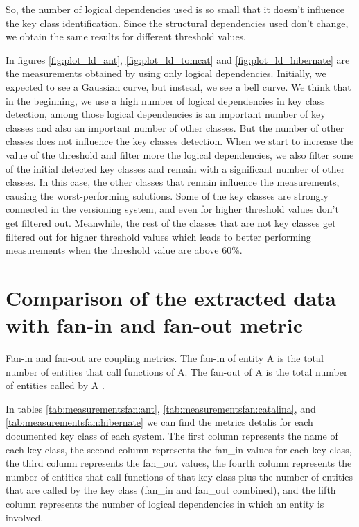 \documentclass[12pt, a4paper, twoside]{report}
\begin{document}
 So, the number of logical dependencies used is so small that it doesn't influence the key class identification. Since the structural dependencies used don't change, we obtain the same results for different threshold values. 



In figures \ref{fig:plot_ld_ant}, \ref{fig:plot_ld_tomcat} and \ref{fig:plot_ld_hibernate} are the measurements obtained by using only logical dependencies.
Initially, we expected to see a Gaussian curve, but instead, we see a bell curve.  We think that in the beginning, we use a high number of logical dependencies in key class detection, among those logical dependencies is an important number of key classes and also an important number of other classes. But the number of other classes does not influence the key classes detection. When we start to increase the value of the threshold and filter more the logical dependencies, we also filter some of the initial detected key classes and remain with a significant number of other classes. In this case, the other classes that remain influence the measurements, causing the worst-performing solutions. 
Some of the key classes are strongly connected in the versioning system, and even for higher threshold values don't get filtered out. Meanwhile, the rest of the classes that are not key classes get filtered out for higher threshold values which leads to better performing measurements when the threshold value are above 60\%. 



\section{Comparison of the extracted data with fan-in and fan-out metric}
\label{sec:metrics}

Fan-in and fan-out are coupling metrics. The fan-in of entity A is the total number of entities that call functions of A. The fan-out of A is the total number of entities called by A \cite{5507329}.


In tables \ref{tab:measurementsfan:ant}, \ref{tab:measurementsfan:catalina}, and \ref{tab:measurementsfan:hibernate} we can find the metrics detalis for each documented key class of each system.
The first column represents the name of each key class, the second column represents the fan\_in values for each key class, the third column represents the fan\_out values, the fourth column represents the number of entities that call functions of that key class plus the number of entities that are called by the key class (fan\_in and fan\_out combined), and the fifth column represents the number of logical dependencies in which an entity is involved. 
\end{document}
